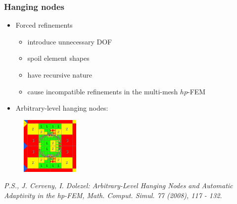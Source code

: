 \begin{frame}
\frametitle{Hanging nodes}
\begin{itemize}
\item Forced refinements
\begin{itemize}
\item introduce unnecessary DOF
\item spoil element shapes
\item have recursive nature
\item cause incompatible refinements in the multi-mesh $hp$-FEM
\end{itemize}
\item Arbitrary-level hanging nodes:
\end{itemize}
\begin{figure}[!ht]
\vspace{-1mm}
\begin{center}
    \includegraphics[width=0.25\textwidth]{mesh_irreg2.png}
\end{center}
\noindent
\vspace{-4mm}
\end{figure}
\noindent
{\em P.S., J. Cerveny, I. Dolezel: Arbitrary-Level Hanging Nodes and Automatic
Adaptivity in the hp-FEM, Math. Comput. Simul. 77 (2008), 117 - 132.}
\end{frame}
